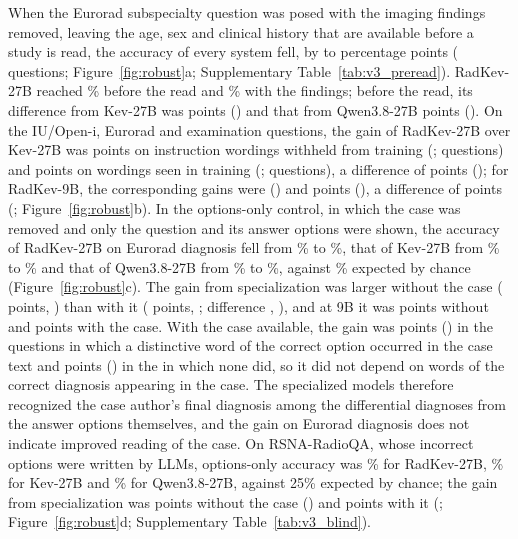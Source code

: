When the Eurorad subspecialty question was posed with the imaging findings removed, leaving the age, sex and clinical history that are available before a study is read, the accuracy of every system fell, by  to  percentage points ( questions; Figure~\ref{fig:robust}a; Supplementary Table~\ref{tab:v3_preread}). %
RadKev-27B reached \% before the read and \% with the findings; before the read, its difference from Kev-27B was  points () and that from Qwen3.8-27B  points (). %
On the IU/Open-i, Eurorad and examination questions, the gain of RadKev-27B over Kev-27B was  points on instruction wordings withheld from training (;  questions) and  points on wordings seen in training (;  questions), a difference of  points (); for RadKev-9B, the corresponding gains were  () and  points (), a difference of  points (; Figure~\ref{fig:robust}b). %
In the options-only control, in which the case was removed and only the question and its answer options were shown, the accuracy of RadKev-27B on Eurorad diagnosis fell from \% to \%, that of Kev-27B from \% to \% and that of Qwen3.8-27B from \% to \%, against \% expected by chance (Figure~\ref{fig:robust}c). The gain from specialization was larger without the case ( points, ) than with it ( points, ; difference , ), and at 9B it was  points without and  points with the case. With the case available, the gain was  points () in the  questions in which a distinctive word of the correct option occurred in the case text and  points () in the  in which none did, so it did not depend on words of the correct diagnosis appearing in the case. The specialized models therefore recognized the case author's final diagnosis among the differential diagnoses from the answer options themselves, and the gain on Eurorad diagnosis does not indicate improved reading of the case. %
On RSNA-RadioQA, whose incorrect options were written by LLMs, options-only accuracy was \% for RadKev-27B, \% for Kev-27B and \% for Qwen3.8-27B, against 25\% expected by chance; the gain from specialization was  points without the case () and  points with it (; Figure~\ref{fig:robust}d; Supplementary Table~\ref{tab:v3_blind}).

